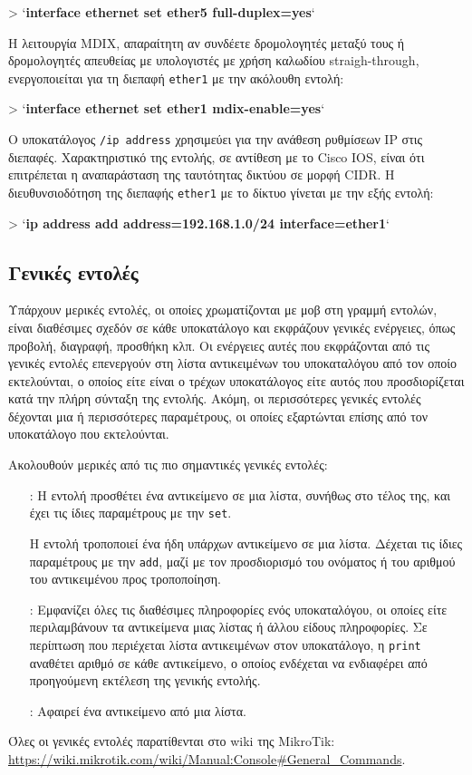 \documentclass{EdipyLabs} %
\begin{document}
\begin{CommandBox}
 > `\textbf{interface ethernet set ether5 full-duplex=yes}`
\end{CommandBox}

H λειτουργία MDIX, απαραίτητη αν συνδέετε δρομολογητές μεταξύ τους ή δρομολογητές απευθείας με υπολογιστές με χρήση καλωδίου straigh-through, ενεργοποιείται για τη διεπαφή \texttt{ether1} με την ακόλουθη εντολή:

\begin{CommandBox}
 > `\textbf{interface ethernet set ether1 mdix-enable=yes}`
\end{CommandBox}

Ο υποκατάλογος \texttt{/ip address} χρησιμεύει για την ανάθεση ρυθμίσεων IP στις διεπαφές. Χαρακτηριστικό της εντολής, σε αντίθεση με το Cisco IOS, είναι ότι επιτρέπεται η αναπαράσταση της ταυτότητας δικτύου σε μορφή CIDR. Η διευθυνσιοδότηση της διεπαφής \texttt{ether1} με το δίκτυο  γίνεται με την εξής εντολή:

\begin{CommandBox}
 > `\textbf{ip address add address=192.168.1.0/24 interface=ether1}`
\end{CommandBox}

\subsection{Γενικές εντολές}
Υπάρχουν μερικές εντολές, οι οποίες χρωματίζονται με μοβ στη γραμμή εντολών, είναι διαθέσιμες σχεδόν σε κάθε υποκατάλογο και εκφράζουν γενικές ενέργειες, όπως προβολή, διαγραφή, προσθήκη κλπ. Οι ενέργειες αυτές που εκφράζονται από τις γενικές εντολές επενεργούν στη λίστα αντικειμένων του υποκαταλόγου από τον οποίο εκτελούνται, ο οποίος είτε είναι ο τρέχων υποκατάλογος είτε αυτός που προσδιορίζεται κατά την πλήρη σύνταξη της εντολής. Ακόμη, οι περισσότερες γενικές εντολές δέχονται μια ή περισσότερες παραμέτρους, οι οποίες εξαρτώνται επίσης από τον υποκατάλογο που εκτελούνται.

Ακολουθούν μερικές από τις πιο σημαντικές γενικές εντολές:
\begin{itemize}
	\item[\ip{add}:] Η εντολή προσθέτει ένα αντικείμενο σε μια λίστα, συνήθως στο τέλος της, και έχει τις ίδιες παραμέτρους με την \texttt{set}.  
	\item[\ip{set}] Η εντολή τροποποιεί ένα ήδη υπάρχων αντικείμενο σε μια λίστα. Δέχεται τις ίδιες παραμέτρους με την \texttt{add}, μαζί με τον προσδιορισμό του ονόματος ή του αριθμού του αντικειμένου προς τροποποίηση. 
	\item[\ip{print}:] Εμφανίζει όλες τις διαθέσιμες πληροφορίες ενός υποκαταλόγου, οι οποίες είτε περιλαμβάνουν τα αντικείμενα μιας λίστας ή άλλου είδους πληροφορίες. Σε περίπτωση που περιέχεται λίστα αντικειμένων στον υποκατάλογο, η \texttt{print} αναθέτει αριθμό σε κάθε αντικείμενο, ο οποίος ενδέχεται να ενδιαφέρει από προηγούμενη εκτέλεση της γενικής εντολής.  
	\item[\ip{remove}:] Αφαιρεί ένα αντικείμενο από μια λίστα.
\end{itemize}
Όλες οι γενικές εντολές παρατίθενται στο wiki της MikroTik: \url{https://wiki.mikrotik.com/wiki/Manual:Console#General_Commands}.
\end{document}
